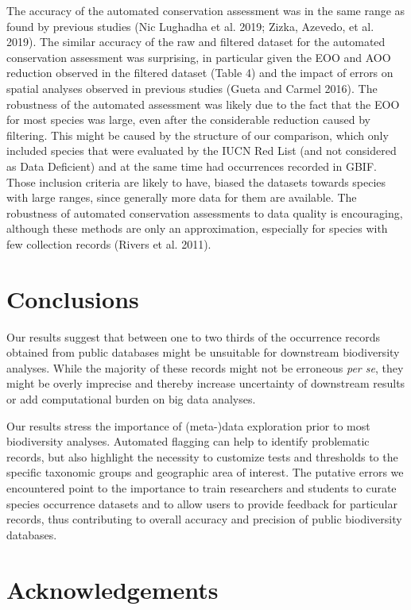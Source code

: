 \documentclass[fleqn,10pt,lineno]{wlpeerj} %
\begin{document}
The accuracy of the automated conservation assessment was in the same range as found by previous studies (Nic Lughadha et al. 2019; Zizka, Azevedo, et al. 2019). The similar accuracy of the raw and filtered dataset for the automated conservation assessment was surprising, in particular given the EOO and AOO reduction observed in the filtered dataset (Table 4) and the impact of errors on spatial analyses observed in previous studies (Gueta and Carmel 2016). The robustness of the automated assessment was likely due to the fact that the EOO for most species was large, even after the considerable reduction caused by filtering. This might be caused by the structure of our comparison, which only included species that were evaluated by the IUCN Red List (and not considered as Data Deficient) and at the same time had occurrences recorded in GBIF. Those inclusion criteria are likely to have, biased the datasets towards species with large ranges, since generally more data for them are available. The robustness of automated conservation assessments to data quality is encouraging, although these methods are only an approximation, especially for species with few collection records (Rivers et al. 2011).

\hypertarget{conclusions}{%
\section*{Conclusions}\label{conclusions}}

Our results suggest that between one to two thirds of the occurrence records obtained from public databases might be unsuitable for downstream biodiversity analyses. While the majority of these records might not be erroneous \emph{per se}, they might be overly imprecise and thereby increase uncertainty of downstream results or add computational burden on big data analyses.

Our results stress the importance of (meta-)data exploration prior to most biodiversity analyses. Automated flagging can help to identify problematic records, but also highlight the necessity to customize tests and thresholds to the specific taxonomic groups and geographic area of interest. The putative errors we encountered point to the importance to train researchers and students to curate species occurrence datasets and to allow users to provide feedback for particular records, thus contributing to overall accuracy and precision of public biodiversity databases.

\hypertarget{acknowledgements}{%
\section*{Acknowledgements}\label{acknowledgements}}
\end{document}
